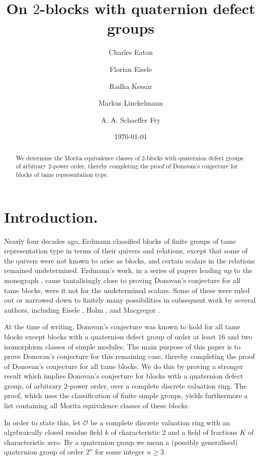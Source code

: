 \documentclass{amsart}
\title{On  $2$-blocks with quaternion  defect groups}
\author[Eaton]{Charles Eaton}
\author[Eisele]{Florian Eisele}
\author[Kessar]{Radha Kessar}
\author[Linckelmann]{Markus Linckelmann}
\author[Schaeffer Fry]{A. A. Schaeffer Fry}
\date{\today}
\theoremstyle{plain}\newtheorem{Theorem}{Theorem}[section]
\theoremstyle{plain}\newtheorem{Conjecture}[Theorem]{Conjecture}
\theoremstyle{plain}\newtheorem{Corollary}[Theorem]{Corollary}
\theoremstyle{plain}\newtheorem{Lemma}[Theorem]{Lemma}
\theoremstyle{plain}\newtheorem{Proposition}[Theorem]{Proposition}
\theoremstyle{definition}\newtheorem{Definition}[Theorem]{Definition}
\theoremstyle{definition}\newtheorem{Example}[Theorem]{Example}
\theoremstyle{definition}\newtheorem{Examples}[Theorem]{Examples}
\theoremstyle{definition}\newtheorem{Exercise}[Theorem]{Exercise}
\theoremstyle{definition}\newtheorem{Notation}[Theorem]{Notation}
\theoremstyle{definition}\newtheorem{Remark}[Theorem]{Remark}
\theoremstyle{definition}\newtheorem{Remarks}[Theorem]{Remarks}
\def\CO{{\mathcal{O}}}    \def\OPE{{\mathcal{O}(P\rtimes E)}}
\numberwithin{equation}{section}
\begin{document}
\begin{abstract}
We determine the Morita equivalence classes of $2$-blocks with  quaternion
defect groups of arbitrary $2$-power order, thereby completing the proof of Donovan's 
conjecture for blocks of tame representation type.
\end{abstract}

\maketitle

\section{Introduction.}  \label{Intro-section} %

Nearly four decades ago, Erdmann classified blocks of finite groups of tame representation
type in terms of their quivers and relations, except that some of the quivers were 
not known to arise as blocks, and certain scalars in the relations remained undetermined.
Erdmann's work, in a series of papers leading up to the monograph \cite{er90}, 
came tantalisingly close to proving Donovan's conjecture for all tame
blocks, were it not for the undetermined scalars. Some of these were ruled out
or narrowed down to finitely many possibilities in subsequent work by several authors,
including Eisele \cite{Eisele16}, Holm \cite{Holm99}, and Macgregor
\cite{Macgregor}. 

At the time of writing, Donovan's conjecture  was known to 
hold for all tame blocks except blocks with a  quaternion defect group of order at least $16$
and two isomorphism classes of simple modules. The main purpose of this paper is to prove
Donovan's conjecture for this remaining case, thereby completing the proof of Donovan's
conjecture for all tame blocks. We do this by proving a stronger
result which implies Donovan's conjecture for blocks with a 
quaternion defect group, of arbitrary $2$-power order, 
over a complete discrete valuation ring. The proof, which
uses the classification of finite simple groups, yields 
furthermore  a list  containing all Morita equivalence classes of these  blocks.

In order to state this, let $\CO$ be a complete discrete valuation ring with
an algebraically closed residue field $k$ of characteristic $2$ and a field of
fractions $K$ of characteristic zero. By a quaternion group we mean a (possibly
generalised) quaternion group of order $2^n$ for some integer $n\geq 3$. 
\end{document}
